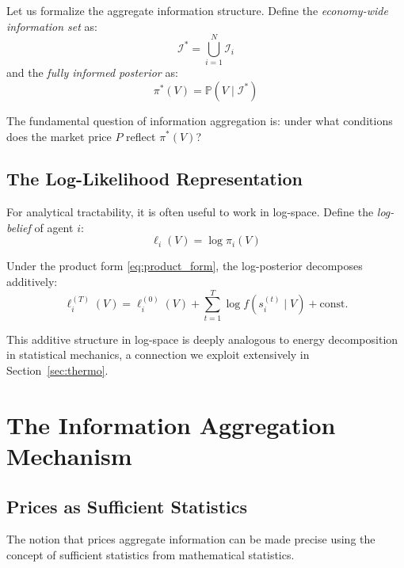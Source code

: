 \documentclass[12pt,a4paper]{article}
\theoremstyle{definition}
\newcommand{\Prob}{\mathbb{P}}
\newcommand{\I}{\mathcal{I}}
\begin{document}
Let us formalize the aggregate information structure. Define the \emph{economy-wide information set} as:
\begin{equation}
    \I^* = \bigcup_{i=1}^{N} \I_i
\end{equation}
and the \emph{fully informed posterior} as:
\begin{equation}\label{eq:full_posterior}
    \pi^*(V) = \Prob(V \mid \I^*)
\end{equation}

The fundamental question of information aggregation is: under what conditions does the market price $P$ reflect $\pi^*(V)$?

\subsection{The Log-Likelihood Representation}

For analytical tractability, it is often useful to work in log-space. Define the \emph{log-belief} of agent $i$:
\begin{equation}
    \ell_i(V) = \log \pi_i(V)
\end{equation}

Under the product form \eqref{eq:product_form}, the log-posterior decomposes additively:
\begin{equation}\label{eq:log_decomposition}
    \ell_i^{(T)}(V) = \ell_i^{(0)}(V) + \sum_{t=1}^{T} \log f(s_i^{(t)} \mid V) + \text{const.}
\end{equation}

This additive structure in log-space is deeply analogous to energy decomposition in statistical mechanics, a connection we exploit extensively in Section~\ref{sec:thermo}.



\section{The Information Aggregation Mechanism}\label{sec:info_aggregation}

\subsection{Prices as Sufficient Statistics}

The notion that prices aggregate information can be made precise using the concept of sufficient statistics from mathematical statistics.
\end{document}
